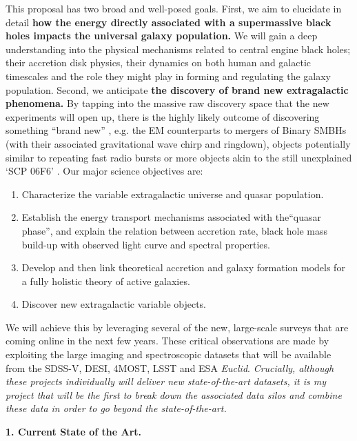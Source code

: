 \documentclass[oneside, a4paper, onecolumn, 11pt]{article}
\begin{document}
\smallskip
\smallskip
\noindent
This proposal has two broad and well-posed goals. First, we aim to
elucidate in detail {\bf how the energy directly associated with a
supermassive black holes impacts the universal galaxy population.} We
will gain a deep understanding into the physical mechanisms related to
central engine black holes; their accretion disk physics, their
dynamics on both human and galactic timescales and the role they might
play in forming and regulating the galaxy population.
Second, we anticipate {\bf the discovery of brand new extragalactic
phenomena.}  By tapping into the massive raw discovery space that
the new experiments will open up, there is the highly likely outcome
of discovering something ``brand new'' \citep{Ivezic2008,
LSST_ScienceBook}, e.g. the EM counterparts to mergers of Binary SMBHs
(with their associated gravitational wave chirp and ringdown),
objects potentially similar to repeating fast radio bursts \citet{Spitler2016} 
or more objects akin to the still
unexplained `SCP 06F6' \citep{Barbary2009}.
Our major science objectives are:
\begin{enumerate}
\item Characterize the variable extragalactic universe and quasar population. 
\item Establish the energy transport mechanisms associated with the``quasar phase'', and explain the relation between accretion rate, black hole mass build-up with observed light curve and spectral properties. 
\item Develop and then link theoretical accretion and galaxy formation models for a fully holistic theory of active galaxies. 
\item Discover new extragalactic variable objects. 
\end{enumerate}

\smallskip
\smallskip
\noindent
We will achieve this by leveraging several of the new, large-scale
surveys that are coming online in the next few years. These critical
observations are made by exploiting the large imaging and
spectroscopic datasets that will be available from the SDSS-V, DESI,
4MOST, LSST and ESA {\it Euclid}. {\it Crucially, although these
projects individually will deliver new state-of-the-art datasets, it
is my project that will be the first to break down the associated
data silos and combine these data in order to go beyond the
state-of-the-art.}


\medskip
\medskip
\noindent
\large
{\bf{\textcolor{Cerulean}{1. Current State of the Art.}}}
\normalsize
\end{document}
